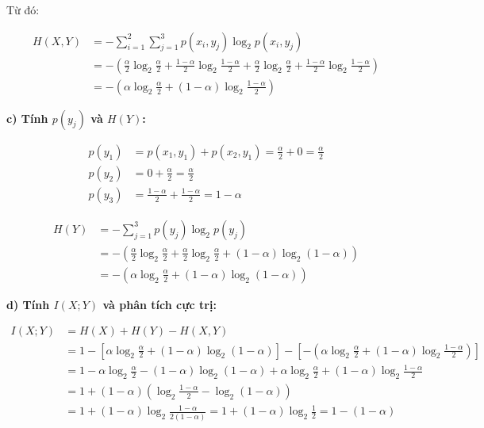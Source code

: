\documentclass[12pt]{article}
\begin{document}
Từ đó:

\[
\begin{aligned}
H(X,Y) &= -\sum_{i=1}^{2} \sum_{j=1}^{3} p(x_i, y_j) \log_2 p(x_i, y_j) \\
&= -\left( \frac{\alpha}{2} \log_2 \frac{\alpha}{2} + \frac{1 - \alpha}{2} \log_2 \frac{1 - \alpha}{2} + \frac{\alpha}{2} \log_2 \frac{\alpha}{2} + \frac{1 - \alpha}{2} \log_2 \frac{1 - \alpha}{2} \right) \\
&= -\left( \alpha \log_2 \frac{\alpha}{2} + (1 - \alpha) \log_2 \frac{1 - \alpha}{2} \right)
\end{aligned}
\]

\textbf{c) Tính $p(y_j)$ và $H(Y)$:}

\[
\begin{aligned}
p(y_1) &= p(x_1, y_1) + p(x_2, y_1) = \frac{\alpha}{2} + 0 = \frac{\alpha}{2} \\
p(y_2) &= 0 + \frac{\alpha}{2} = \frac{\alpha}{2} \\
p(y_3) &= \frac{1 - \alpha}{2} + \frac{1 - \alpha}{2} = 1 - \alpha
\end{aligned}
\]

\[
\begin{aligned}
H(Y) &= - \sum_{j=1}^{3} p(y_j) \log_2 p(y_j) \\
&= - \left( \frac{\alpha}{2} \log_2 \frac{\alpha}{2} + \frac{\alpha}{2} \log_2 \frac{\alpha}{2} + (1 - \alpha) \log_2 (1 - \alpha) \right) \\
&= - \left( \alpha \log_2 \frac{\alpha}{2} + (1 - \alpha) \log_2 (1 - \alpha) \right)
\end{aligned}
\]

\textbf{d) Tính $I(X;Y)$ và phân tích cực trị:}

\[
\begin{aligned}
I(X;Y) &= H(X) + H(Y) - H(X,Y) \\
&= 1 - \left[ \alpha \log_2 \frac{\alpha}{2} + (1 - \alpha) \log_2 (1 - \alpha) \right] - \left[ -\left( \alpha \log_2 \frac{\alpha}{2} + (1 - \alpha) \log_2 \frac{1 - \alpha}{2} \right) \right] \\
&= 1 - \alpha \log_2 \frac{\alpha}{2} - (1 - \alpha) \log_2 (1 - \alpha) + \alpha \log_2 \frac{\alpha}{2} + (1 - \alpha) \log_2 \frac{1 - \alpha}{2} \\
&= 1 + (1 - \alpha) \left( \log_2 \frac{1 - \alpha}{2} - \log_2 (1 - \alpha) \right) \\
&= 1 + (1 - \alpha) \log_2 \frac{1 - \alpha}{2(1 - \alpha)} = 1 + (1 - \alpha) \log_2 \frac{1}{2} = 1 - (1 - \alpha)
\end{aligned}
\]
\end{document}
